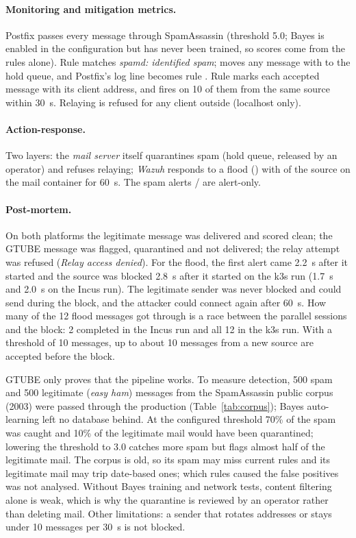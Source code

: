 \paragraph{Monitoring and mitigation metrics.}
Postfix passes every message through SpamAssassin (threshold 5.0; Bayes is enabled in the
configuration but has never been trained, so scores come from the rules alone). Rule
 matches \emph{spamd: identified spam};  moves any message with
 to the hold queue, and Postfix's log line becomes rule . Rule
 marks each accepted message with its client address, and  fires on 10 of
them from the same source within 30~s. Relaying is refused for any client outside
 (localhost only).

\paragraph{Action-response.}
Two layers: the \emph{mail server} itself quarantines spam (hold queue, released by an operator)
and refuses relaying; \emph{Wazuh} responds to a flood () with  of the
source on the mail container for 60~s. The spam alerts / are alert-only.

\paragraph{Post-mortem.}
On both platforms the legitimate message was delivered and scored clean; the GTUBE message was
flagged, quarantined and not delivered; the relay attempt was refused (\emph{Relay access
denied}). For the flood, the first  alert came 2.2~s after it started and the source was
blocked 2.8~s after it started on the k3s run (1.7~s and 2.0~s on the Incus run). The legitimate
sender was never blocked and could send during the block, and the attacker could connect again after
60~s. How many of the 12 flood messages got through is a race between the parallel sessions and the
block: 2 completed in the Incus run and all 12 in the k3s run. With a threshold of 10 messages, up
to about 10 messages from a new source are accepted before the block.

GTUBE only proves that the pipeline works. To measure detection, 500 spam and 500
legitimate (\emph{easy ham}) messages from the SpamAssassin public corpus (2003) were passed through the
production  (Table~\ref{tab:corpus}); Bayes auto-learning left no database behind. At the
configured threshold 70\% of the spam was caught and 10\% of the legitimate mail would have been
quarantined; lowering the threshold to 3.0 catches more spam but flags almost half of the
legitimate mail. The corpus is old, so its spam may miss current rules and its legitimate mail may
trip date-based ones; which rules caused the false positives was not analysed. Without Bayes
training and network tests, content filtering alone is weak, which is why the quarantine is
reviewed by an operator rather than deleting mail. Other limitations: a sender that rotates
addresses or stays under 10 messages per 30~s is not blocked.

